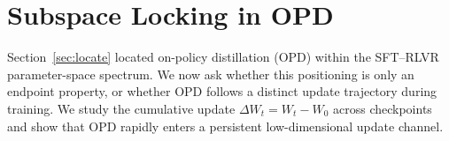 







\section{Subspace Locking in OPD}
\label{sec:subspace-lock}

Section~\ref{sec:locate} located on-policy distillation (OPD) within the SFT--RLVR parameter-space spectrum. We now ask whether this positioning is only an endpoint property, or whether OPD follows a distinct update trajectory during training. We study the cumulative update
$\Delta W_t = W_t - W_0$ across checkpoints and show that OPD rapidly
enters a persistent low-dimensional update channel.

